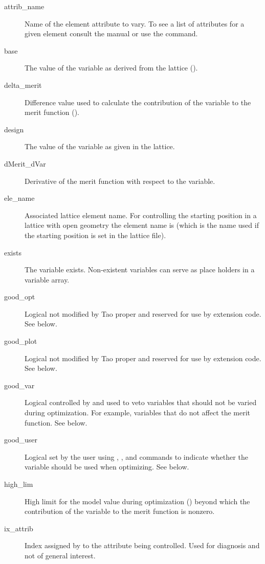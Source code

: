   \begin{description}
  \item[attrib_name] \Newline
Name of the element attribute to vary. To see a list of attributes for a given element
consult the \bmad manual or use the  command.
  \item[base] \Newline
The value of the variable as derived from the  lattice ().
  \item[delta_merit] \Newline
Difference value used to calculate the contribution of the variable to the merit function ().
  \item[design] \Newline
The value of the variable as given in the  lattice.
  \item[dMerit_dVar] \Newline
Derivative of the merit function with respect to the variable.
  \item[ele_name] \Newline
Associated lattice element name. For controlling the starting position in a lattice with open
geometry the element name is  (which is the name used if the starting position is
set in the lattice file). 
  \item[exists] \Newline
The variable exists. Non-existent variables can serve as place holders in a variable
array.
  \item[good_opt] \Newline
Logical not modified by Tao proper and reserved for use by extension code. See below.
  \item[good_plot] \Newline
Logical not modified by Tao proper and reserved for use by extension code. See below.
  \item[good_var] \Newline
Logical controlled by \tao and used to veto variables that should not be varied during
optimization. For example, variables that do not affect the merit function. See below.
  \item[good_user] \Newline
Logical set by the user using , , and  commands to indicate
whether the variable should be used when optimizing. See below.
  \item[high_lim] \Newline
High limit for the model value during optimization () beyond which
the contribution of the variable to the merit function is nonzero.
  \item[ix_attrib] \Newline
Index assigned by \bmad to the attribute being controlled. Used for diagnosis and not
of general interest.

\end{description}
